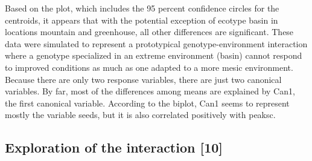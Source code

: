 \documentclass{article}
\begin{document}
Based on the plot, which includes the 95 percent confidence circles for the centroids, it appears that with the potential exception of ecotype basin in locations mountain and greenhouse, all other differences are significant. These data were simulated to represent a prototypical genotype-environment interaction where a genotype specialized in an extreme environment (basin) cannot respond to improved conditions as much as one adapted to a more mesic environment.
Because there are only two response variables, there are just two canonical variables. By far, most of the differences among means are explained by Can1, the first canonical variable. According to the biplot, Can1 seems to represent mostly the variable seeds, but it is also correlated positively with peaksc.

\subsection{Exploration of the interaction [10]}
\end{document}
